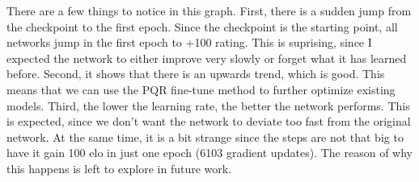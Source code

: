 There are a few things to notice in this graph. First, there is a sudden jump from the checkpoint to the first epoch. Since the checkpoint is the starting point, all networks jump in the first epoch to +100 rating. This is suprising, since I expected the network to either improve very slowly or forget what it has learned before.
Second, it shows that there is an upwards trend, which is good. This means that we can use the PQR fine-tune method to further optimize existing models.
Third, the lower the learning rate, the better the network performs. This is expected, since we don't want the network to deviate too fast from the original network. At the same time, it is a bit strange since the steps are not that big to have it gain 100 elo in just one epoch (6103 gradient updates). The reason of why this happens is left to explore in future work.
